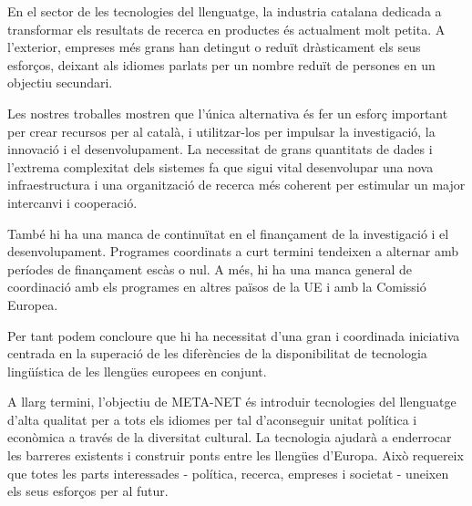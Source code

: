 \begin{multicols}{2}
En el sector de les tecnologies del llenguatge, la industria catalana dedicada a transformar els resultats de recerca en productes és actualment molt petita. A l'exterior, empreses més grans han detingut o reduït dràsticament els seus esforços, deixant als idiomes parlats per un nombre reduït de persones en un objectiu secundari.

Les nostres troballes mostren que l'única alternativa és fer un esforç important per crear recursos per al català, i utilitzar-los per impulsar la investigació, la innovació i el desenvolupament. La necessitat de grans quantitats de dades i l'extrema complexitat dels sistemes fa que sigui vital desenvolupar una nova infraestructura i una organització de recerca més coherent per estimular un major intercanvi i cooperació.

També hi ha una manca de continuïtat en el finançament de la investigació i el desenvolupament. Programes coordinats a curt termini tendeixen a alternar amb períodes de finançament escàs o nul. A més, hi ha una manca general de coordinació amb els programes en altres països de la UE i amb la Comissió Europea.

Per tant podem concloure que hi ha necessitat d'una gran i coordinada iniciativa centrada en la superació de les diferències de la disponibilitat de tecnologia lingüística de les llengües europees en conjunt.


A llarg termini, l’objectiu de META-NET és introduir tecnologies del llenguatge d'alta qualitat per a tots els idiomes per tal d'aconseguir unitat política i econòmica a través de la diversitat cultural. La tecnologia ajudarà a enderrocar les barreres existents i construir ponts entre les llengües d'Europa. Això requereix que totes les parts interessades - política, recerca, empreses i societat - uneixen els seus esforços per al futur.


\end{multicols}

\cleardoublepage



